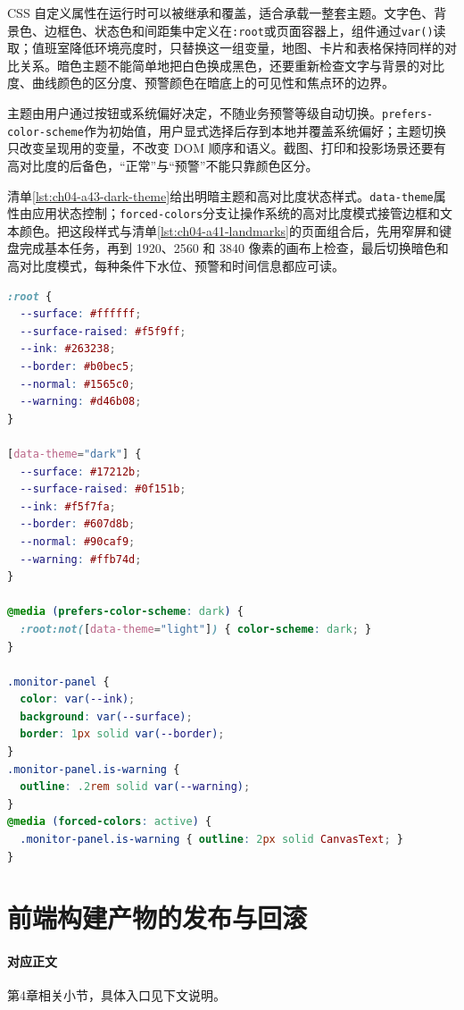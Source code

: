 CSS 自定义属性在运行时可以被继承和覆盖，适合承载一整套主题。文字色、背景色、边框色、状态色和间距集中定义在\texttt{:root}或页面容器上，组件通过\texttt{var()}读取；值班室降低环境亮度时，只替换这一组变量，地图、卡片和表格保持同样的对比关系。暗色主题不能简单地把白色换成黑色，还要重新检查文字与背景的对比度、曲线颜色的区分度、预警颜色在暗底上的可见性和焦点环的边界。

主题由用户通过按钮或系统偏好决定，不随业务预警等级自动切换。\texttt{prefers-color-scheme}作为初始值，用户显式选择后存到本地并覆盖系统偏好；主题切换只改变呈现用的变量，不改变 DOM 顺序和语义。截图、打印和投影场景还要有高对比度的后备色，“正常”与“预警”不能只靠颜色区分。

清单\ref{lst:ch04-a43-dark-theme}给出明暗主题和高对比度状态样式。\texttt{data-theme}属性由应用状态控制；\texttt{forced-colors}分支让操作系统的高对比度模式接管边框和文本颜色。把这段样式与清单\ref{lst:ch04-a41-landmarks}的页面组合后，先用窄屏和键盘完成基本任务，再到 1920、2560 和 3840 像素的画布上检查，最后切换暗色和高对比度模式，每种条件下水位、预警和时间信息都应可读。

\begin{lstlisting}[label={lst:ch04-a43-dark-theme},language=CSS,caption={监测页面的明暗主题与高对比度}]
:root {
  --surface: #ffffff;
  --surface-raised: #f5f9ff;
  --ink: #263238;
  --border: #b0bec5;
  --normal: #1565c0;
  --warning: #d46b08;
}

[data-theme="dark"] {
  --surface: #17212b;
  --surface-raised: #0f151b;
  --ink: #f5f7fa;
  --border: #607d8b;
  --normal: #90caf9;
  --warning: #ffb74d;
}

@media (prefers-color-scheme: dark) {
  :root:not([data-theme="light"]) { color-scheme: dark; }
}

.monitor-panel {
  color: var(--ink);
  background: var(--surface);
  border: 1px solid var(--border);
}
.monitor-panel.is-warning {
  outline: .2rem solid var(--warning);
}
@media (forced-colors: active) {
  .monitor-panel.is-warning { outline: 2px solid CanvasText; }
}
\end{lstlisting}



\section{前端构建产物的发布与回滚}\label{app:ext-fe-release}

\paragraph{对应正文}第4章相关小节，具体入口见下文说明。

